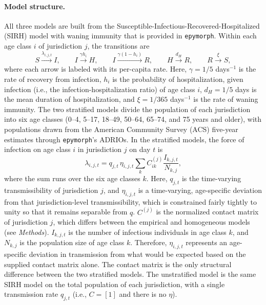 \paragraph{Model structure.} 
All three models are built from the Susceptible-Infectious-Recovered-Hospitalized (SIRH) model with waning immunity that is provided in \texttt{epymorph}. 
Within each age class $i$ of jurisdiction $j$, the transitions are
\begin{equation}
S \xrightarrow{\lambda_{i,j,t}} I, \qquad
I \xrightarrow{\gamma h_i} H, \qquad
I \xrightarrow{\gamma (1-h_i)} R, \qquad
H \xrightarrow{d_H} R, \qquad
R \xrightarrow{\xi} S,
\end{equation}
where each arrow is labeled with its per-capita rate. 
Here, $\gamma = 1/5$ days$^{-1}$ is the rate of recovery from infection, $h_i$ is the probability of hospitalization, given infection (i.e., the infection-hospitalization ratio) of age class $i$, $d_H = 1/5$ days is the mean duration of hospitalization, and $\xi = 1/365$ days$^{-1}$ is the rate of waning immunity. 
The two stratified models divide the population of each jurisdiction into six age classes (0--4, 5--17, 18--49, 50--64, 65--74, and 75 years and older), with populations drawn from the American Community Survey (ACS) five-year estimates through \texttt{epymorph}'s ADRIOs. 
In the stratified models, the force of infection on age class $i$ in jurisdiction $j$ on day $t$ is
\begin{equation}\label{eq:flu-foi}
\lambda_{i,j,t} = q_{j,t} \, \eta_{i,j,t} \sum_{k} C^{(j)}_{ik} \frac{I_{k,j,t}}{N_{k,j}},
\end{equation}
where the sum runs over the six age classes $k$. 
Here, $q_{j,t}$ is the time-varying transmissibility of jurisdiction $j$, and $\eta_{i,j,t}$ is a time-varying, age-specific deviation from that jurisdiction-level transmissibility, which is constrained fairly tightly to unity so that it remains separable from $q$. 
$C^{(j)}$ is the normalized contact matrix of jurisdiction $j$, which differs between the empirical and homogeneous models (see \textit{Methods}).
$I_{k,j,t}$ is the number of infectious individuals in age class $k$, and $N_{k,j}$ is the population size of age class $k$. 
Therefore, $\eta_{i,j,t}$ represents an age-specific deviation in transmission from what would be expected based on the supplied contact matrix alone. 
The contact matrix is the only structural difference between the two stratified models. 
The unstratified model is the same SIRH model on the total population of each jurisdiction, with a single transmission rate $q_{j,t}$ (i.e., $C = [1]$ and there is no $\eta$).

